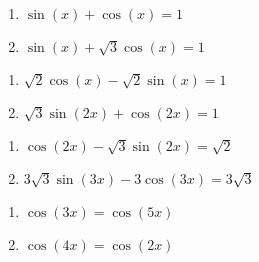 \begin{multicols}{2}

\begin{enumerate}

\setcounter{enumi}{\value{HW}}

\item $\sin(x) + \cos(x) = 1$
\item  $\sin(x) + \sqrt{3} \cos(x) = 1$

\setcounter{HW}{\value{enumi}}

\end{enumerate}

\end{multicols}

\begin{multicols}{2}

\begin{enumerate}

\setcounter{enumi}{\value{HW}}

\item  $\sqrt{2} \cos(x) - \sqrt{2} \sin(x) = 1$
\item  $\sqrt{3} \sin(2x) +  \cos(2x) = 1$

\setcounter{HW}{\value{enumi}}

\end{enumerate}

\end{multicols}

\begin{multicols}{2}

\begin{enumerate}

\setcounter{enumi}{\value{HW}}

\item $\cos(2x) - \sqrt{3} \sin(2x) = \sqrt{2}$
\item $3\sqrt{3}\sin(3x) - 3\cos(3x) = 3\sqrt{3}$

\setcounter{HW}{\value{enumi}}

\end{enumerate}

\end{multicols}

\begin{multicols}{2}

\begin{enumerate}

\setcounter{enumi}{\value{HW}}

\item  $\cos(3x) = \cos(5x)$
\item $\cos(4x) = \cos(2x)$

\setcounter{HW}{\value{enumi}}

\end{enumerate}

\end{multicols}

